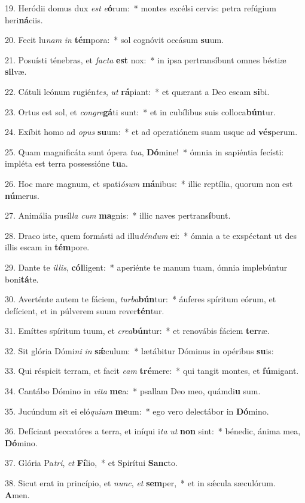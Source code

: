 19. Heródii domus dux \textit{est} \textit{e}\textbf{ó}rum:~*  montes excélsi cervis: petra refúgium heri\textbf{ná}ciis.\

20. Fecit lu\textit{nam} \textit{in} \textbf{tém}pora:~*  sol cognóvit occásum \textbf{su}um.\

21. Posuísti ténebras, et \textit{fac}\textit{ta} \textbf{est} nox:~*  in ipsa pertransíbunt omnes béstiæ \textbf{sil}væ.\

22. Cátuli leónum rugién\textit{tes}, \textit{ut} \textbf{rá}piant:~*  et quærant a Deo escam \textbf{si}bi.\

23. Ortus est sol, et \textit{con}\textit{gre}\textbf{gá}ti sunt:~*  et in cubílibus suis colloca\textbf{bún}tur.\

24. Exíbit homo ad \textit{o}\textit{pus} \textbf{su}um:~*  et ad operatiónem suam usque ad \textbf{vés}perum.\

25. Quam magnificáta sunt ópera \textit{tu}\textit{a}, \textbf{Dó}mine!~*  ómnia in sapiéntia fecísti: impléta est terra possessióne \textbf{tu}a.\

26. Hoc mare magnum, et spati\textit{ó}\textit{sum} \textbf{má}nibus:~*  illic reptília, quorum non est \textbf{nú}merus.\

27. Animália pusíl\textit{la} \textit{cum} \textbf{ma}gnis:~*  illic naves pertrans\textbf{í}bunt.\

28. Draco iste, quem formásti ad illu\textit{dén}\textit{dum} \textbf{e}i:~*  ómnia a te exspéctant ut des illis escam in \textbf{tém}pore.\

29. Dante te \textit{il}\textit{lis}, \textbf{cól}ligent:~*  aperiénte te manum tuam, ómnia implebúntur boni\textbf{tá}te.\

30. Averténte autem te fáciem, \textit{tur}\textit{ba}\textbf{bún}tur:~*  áuferes spíritum eórum, et defícient, et in púlverem suum rever\textbf{tén}tur.\

31. Emíttes spíritum tuum, et \textit{cre}\textit{a}\textbf{bún}tur:~*  et renovábis fáciem \textbf{ter}ræ.\

32. Sit glória Dómi\textit{ni} \textit{in} \textbf{sǽ}culum:~*  lætábitur Dóminus in opéribus \textbf{su}is:\

33. Qui réspicit terram, et facit \textit{e}\textit{am} \textbf{tré}mere:~*  qui tangit montes, et \textbf{fú}migant.\

34. Cantábo Dómino in \textit{vi}\textit{ta} \textbf{me}a:~*  psallam Deo meo, quámdi\textbf{u} sum.\

35. Jucúndum sit ei eló\textit{qui}\textit{um} \textbf{me}um:~*  ego vero delectábor in \textbf{Dó}mino.\

36. Defíciant peccatóres a terra, et iníqui i\textit{ta} \textit{ut} \textbf{non} sint:~*  bénedic, ánima mea, \textbf{Dó}mino.\

37. Glória Pa\textit{tri}, \textit{et} \textbf{Fí}lio,~*  et Spirítui \textbf{Sanc}to.\

38. Sicut erat in princípio, et \textit{nunc}, \textit{et} \textbf{sem}per,~*  et in sǽcula sæculórum. \textbf{A}men.\

